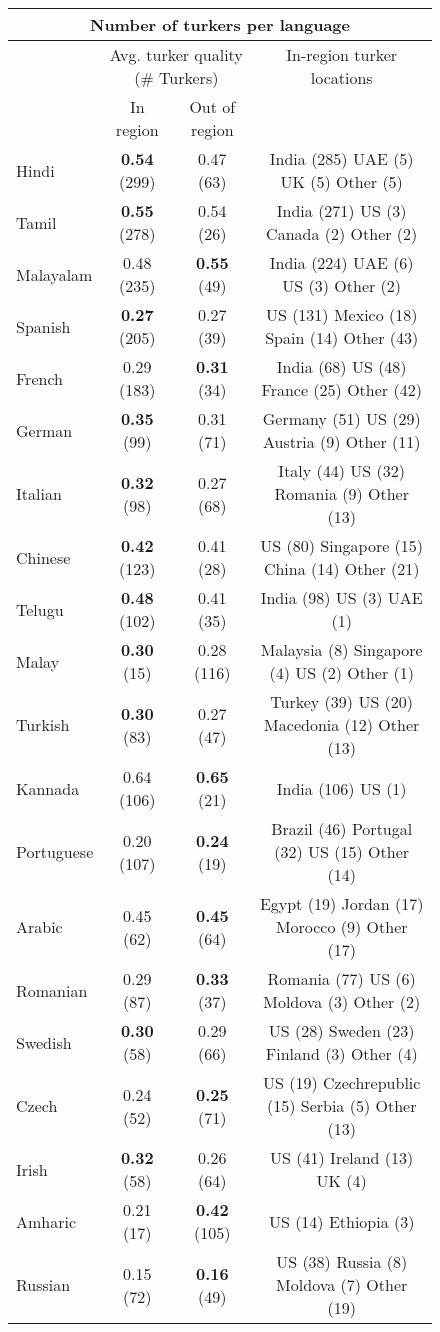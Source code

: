 \begin{figure}[h]
\centering
\begin{tabular}{lccc}
\multicolumn{4}{c}{Number of turkers per language}\\
\hline\hline
&\multicolumn{2}{c}{Avg. turker quality (\# Turkers)}&In-region turker locations\\
&In region&Out of region\\
\hline\hline
Hindi&\textbf{0.54} (299)&0.47 (63)&India (285) UAE (5) UK (5) Other (5) \\
Tamil&\textbf{0.55} (278)&0.54 (26)&India (271) US (3) Canada (2) Other (2) \\
Malayalam&0.48 (235) &\textbf{0.55} (49)&India (224) UAE (6) US (3) Other (2) \\
Spanish&\textbf{0.27} (205)&0.27 (39)&US (131) Mexico (18) Spain (14) Other (43) \\
French&0.29 (183) &\textbf{0.31} (34)&India (68) US (48) France (25) Other (42) \\
German&\textbf{0.35} (99)&0.31 (71)&Germany (51) US (29) Austria (9) Other (11) \\
Italian&\textbf{0.32} (98)&0.27 (68)&Italy (44) US (32) Romania (9) Other (13) \\
Chinese&\textbf{0.42} (123)&0.41 (28)&US (80) Singapore (15) China (14) Other (21) \\
Telugu&\textbf{0.48} (102)&0.41 (35)&India (98) US (3) UAE (1) \\
Malay&\textbf{0.30} (15)&0.28 (116)&Malaysia (8) Singapore (4) US (2) Other (1) \\
Turkish&\textbf{0.30} (83)&0.27 (47)&Turkey (39) US (20) Macedonia (12) Other (13) \\
Kannada&0.64 (106) &\textbf{0.65} (21)&India (106) US (1) \\
Portuguese&0.20 (107) &\textbf{0.24} (19)&Brazil (46) Portugal (32) US (15) Other (14) \\
Arabic&0.45 (62) &\textbf{0.45} (64)&Egypt (19) Jordan (17) Morocco (9) Other (17) \\
Romanian&0.29 (87) &\textbf{0.33} (37)&Romania (77) US (6) Moldova (3) Other (2) \\
Swedish&\textbf{0.30} (58)&0.29 (66)&US (28) Sweden (23) Finland (3) Other (4) \\
Czech&0.24 (52) &\textbf{0.25} (71)&US (19) Czechrepublic (15) Serbia (5) Other (13) \\
Irish&\textbf{0.32} (58)&0.26 (64)&US (41) Ireland (13) UK (4) \\
Amharic&0.21 (17) &\textbf{0.42} (105)&US (14) Ethiopia (3) \\
Russian&0.15 (72) &\textbf{0.16} (49)&US (38) Russia (8) Moldova (7) Other (19) \\
\hline\hline
\end{tabular}
\end{figure}
